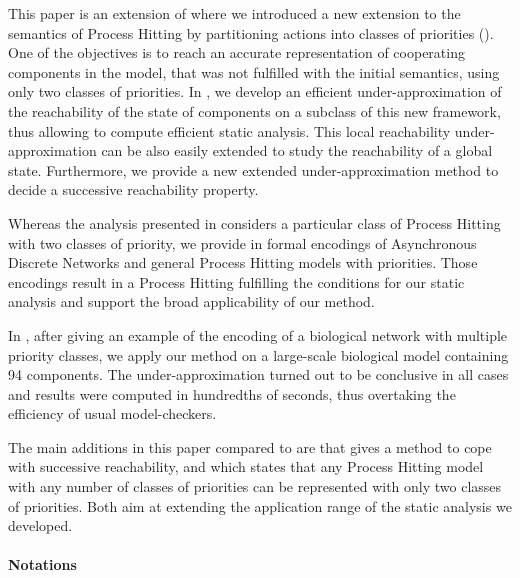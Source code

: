 This paper is an extension of \cite{FPMR13-CS2Bio} where we
introduced a new extension to the semantics of Process Hitting by partitioning actions into classes of priorities
().
One of the objectives is to reach an accurate representation of cooperating components in the model, that was not fulfilled with the initial semantics, using only two classes of priorities.
In ,
we develop an efficient under-approximation of the reachability of the state of components on a subclass of this new framework, thus allowing to compute efficient static analysis.
This local reachability under-approximation can be also easily extended to study the reachability of a global state.
Furthermore, we provide a new extended under-approximation method to decide a successive reachability property.

Whereas the analysis presented in  considers a particular class of
Process Hitting with two classes of priority,
we provide in  formal encodings of Asynchronous Discrete Networks and general
Process Hitting models with priorities.
Those encodings result in a Process Hitting fulfilling the conditions for our
static analysis and support the broad applicability of our method.

In , after giving an example of the encoding of a biological
network with multiple priority classes,
we apply our method on a large-scale biological model containing 94 components.
The under-approximation turned out to be conclusive in all cases and results were computed in hundredths of seconds,
thus overtaking the efficiency of usual model-checkers.


The main additions in this paper compared to \cite{FPMR13-CS2Bio} are
 that gives a method to cope with successive reachability,
and %
 which states that any Process Hitting model with any number of classes of priorities
can be represented with only two classes of priorities.
Both aim at extending the application range of the static analysis we developed.



\paragraph*{Notations}

